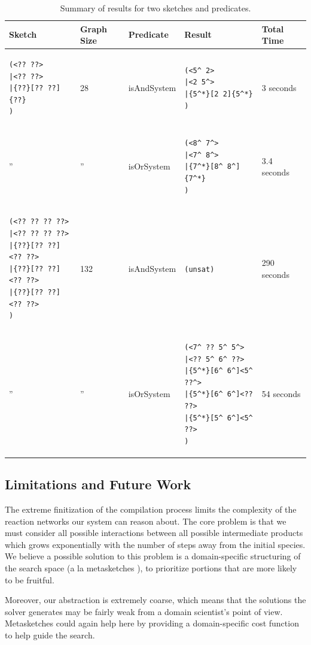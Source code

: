 \documentclass{article}[10pt]
\begin{document}
\begin{table}
\centering
\begin{tabular}{|l|l|l|l|l|}\hline
Sketch     &  Graph Size &  Predicate &  Result  & Total Time \\ \hline
\begin{lstlisting}
(<?? ??>
|<?? ??>
|{??}[?? ??]{??}
)
\end{lstlisting}
&
28
&
isAndSystem
&
\begin{lstlisting}
(<5^ 2>
|<2 5^>
|{5^*}[2 2]{5^*}
)
\end{lstlisting}
&
3 seconds
\\ \hline
''
&
''
&
isOrSystem
&
\begin{lstlisting}
(<8^ 7^>
|<7^ 8^>
|{7^*}[8^ 8^]{7^*}
)
\end{lstlisting}
&
3.4 seconds
\\ \hline
\begin{lstlisting}
(<?? ?? ?? ??>
|<?? ?? ?? ??>
|{??}[?? ??]<?? ??>
|{??}[?? ??]<?? ??>
|{??}[?? ??]<?? ??>
)
\end{lstlisting}
&
132
&
isAndSystem
&
\verb;(unsat);
&
290 seconds
\\ \hline
''
&
''
&
isOrSystem
&
\begin{lstlisting}
(<7^ ?? 5^ 5^>
|<?? 5^ 6^ ??>
|{5^*}[6^ 6^]<5^ ??^>
|{5^*}[6^ 6^]<?? ??>
|{5^*}[5^ 6^]<5^ ??>
)
\end{lstlisting}
&
54 seconds
\\ \hline
\end{tabular}
\caption{Summary of results for two sketches and predicates.}
\label{table:results}
\end{table}

\subsection{Limitations and Future Work}
The extreme finitization of the compilation process limits the complexity
of the reaction networks our system can reason about. The core problem is
that we must consider all possible interactions between all possible
intermediate products which grows exponentially with the number of steps away
from the initial species. We believe a possible solution to this problem
is a domain-specific structuring of the search space (a la metasketches
\cite{metasketches}), to prioritize portions that are more likely to be
fruitful.

Moreover, our abstraction is extremely coarse, which means that the
solutions the solver generates may be fairly weak from a domain scientist's
point of view. Metasketches could again help here by providing a domain-specific
cost function to help guide the search.
\end{document}
